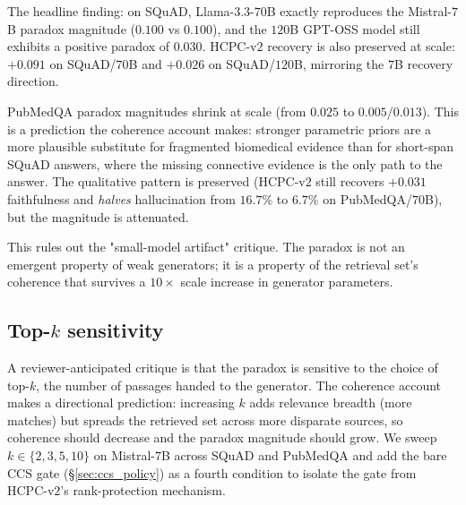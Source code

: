 The headline finding: on SQuAD, Llama-$3.3$-$70$B exactly reproduces
the Mistral-$7$B paradox magnitude ($0.100$ vs $0.100$), and the
$120$B GPT-OSS model still exhibits a positive paradox of $0.030$.
HCPC-v$2$ recovery is also preserved at scale: $+0.091$ on SQuAD/$70$B
and $+0.026$ on SQuAD/$120$B, mirroring the $7$B recovery direction.

PubMedQA paradox magnitudes shrink at scale (from $0.025$ to
$0.005$/$0.013$). This is a prediction the coherence account makes:
stronger parametric priors are a more plausible substitute for
fragmented biomedical evidence than for short-span SQuAD answers,
where the missing connective evidence is the only path to the answer.
The qualitative pattern is preserved (HCPC-v$2$ still recovers
$+0.031$ faithfulness and \emph{halves} hallucination from $16.7\%$ to
$6.7\%$ on PubMedQA/$70$B), but the magnitude is attenuated.

This rules out the "small-model artifact" critique. The paradox is
not an emergent property of weak generators; it is a property of the
retrieval set's coherence that survives a $10\times$ scale increase in
generator parameters.

\subsection{Top-$k$ sensitivity}
\label{sec:rob:topk}

A reviewer-anticipated critique is that the paradox is sensitive to the
choice of top-$k$, the number of passages handed to the generator. The
coherence account makes a directional prediction: increasing $k$ adds
relevance breadth (more matches) but spreads the retrieved set across
more disparate sources, so coherence should decrease and the paradox
magnitude should grow. We sweep $k \in \{2, 3, 5, 10\}$ on Mistral-$7$B
across SQuAD and PubMedQA and add the bare CCS gate
(\S\ref{sec:ccs_policy}) as a fourth condition to isolate the gate from
HCPC-v$2$'s rank-protection mechanism.

\begin{table}[!htb]
\centering
\caption{Top-$k$ sensitivity on Mistral-7B, $n=30$ per cell.
Numbers auto-populated from
\texttt{results/topk\_sensitivity/paradox\_by\_k.csv} by
\texttt{experiments/build\_topk\_table.py}.
\emph{$\Delta_{\textrm{paradox}}$} is faith$_{\textrm{base}}-$faith$_{\textrm{v1}}$;
\emph{gate~rec.} is the bare CCS-gate's recovery vs HCPC-v$1$;
\emph{v$2$~rec.} is HCPC-v$2$'s recovery vs HCPC-v$1$.}
\label{tab:topk}
\footnotesize

\end{table}

